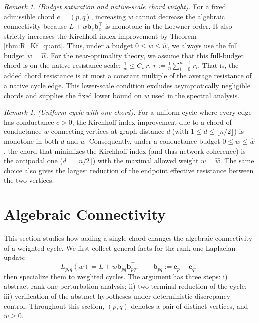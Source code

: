 \documentclass[11pt]{article}
\numberwithin{equation}{section}
\theoremstyle{definition}
\theoremstyle{remark}
\newtheorem{remark}[theorem]{Remark}
\begin{document}
\begin{remark}\label{remark:budget}\emph{(Budget saturation and native-scale chord weight).}
	For a fixed admissible chord $e=(p,q)$, increasing $w$ cannot
	decrease the algebraic connectivity because
	$L+w \boldsymbol{b}_e \boldsymbol{b}_e^\top$ is monotone in the Loewner order. It also strictly	increases the Kirchhoff-index improvement by Theorem \ref{thm:R_Kf_quant}.
	Thus, under a budget $0\le w\le \hat w$, we always use the full
	budget $w=\hat w$. For the near-optimality theory, we assume that this full-budget chord is on the native resistance scale:
	$\frac{1}{\hat w}\le C_w\bar r$, $\bar r:=\frac{1}{n}\sum_{i=0}^{n-1}r_i .$
	That is, the added chord resistance is at most a constant multiple of
	the average resistance of a native cycle edge. This lower-scale
	condition excludes asymptotically negligible chords and supplies the
	fixed lower bound on $w$ used in the spectral analysis.
\end{remark}

\begin{remark}\emph{(Uniform cycle with one chord).}
	For a uniform cycle where every edge has conductance $c>0$, 
	the Kirchhoff index improvement due to a chord of conductance $w$
	connecting vertices at graph distance $d$ (with $1\le d\le \lfloor n/2\rfloor$)
	is monotone in both $d$ and $w$.
	Consequently, under a conductance budget $0\le w\le \hat{w}$,
	the chord that minimizes the Kirchhoff index
	(and thus network coherence) is the antipodal one 
	($d=\lfloor n/2\rfloor$) with the maximal allowed weight $w=\hat{w}$.
	The same choice also gives the largest reduction of the endpoint
	effective resistance between the two vertices.
\end{remark}

\section{Algebraic Connectivity}\label{sec:algconn}

This section studies how adding a single chord changes the algebraic
connectivity of a weighted cycle. We first collect general facts for the
rank-one Laplacian update
\[
L_{p,q}(w)=L+w\boldsymbol{b}_{pq}\boldsymbol{b}_{pq}^{\top},
\qquad
\boldsymbol{b}_{pq}:=\boldsymbol{e}_p-\boldsymbol{e}_q,
\]
then specialize them to weighted cycles. The argument has three steps:
i) abstract rank-one perturbation analysis; ii) two-terminal reduction of
the cycle; iii) verification of the abstract hypotheses under deterministic
discrepancy control. Throughout this section, $(p,q)$ denotes a pair of
distinct vertices, and $w\ge 0$.
\end{document}
